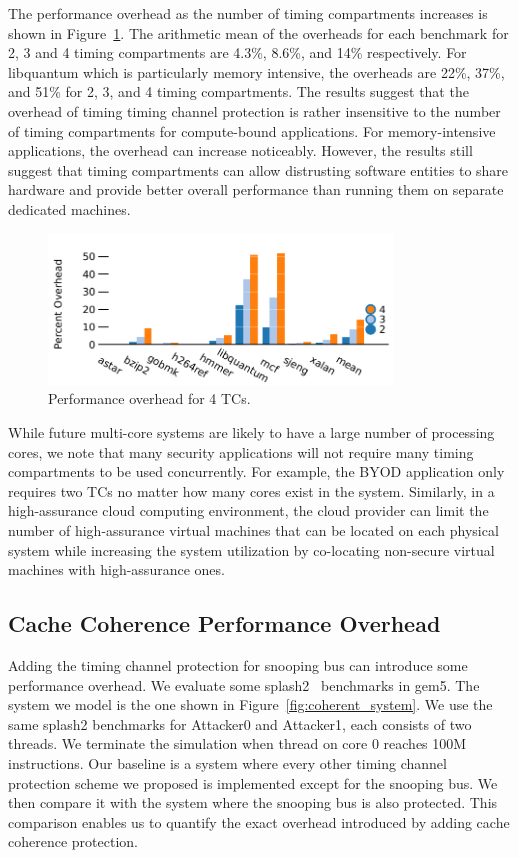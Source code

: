 The performance overhead as the number of timing compartments increases is 
shown in Figure~\ref{fig:scalability}. The arithmetic mean of the overheads for 
each benchmark for 2, 3 and 4 timing compartments are 4.3\%, 8.6\%, and 14\% 
respectively. For libquantum which is particularly memory intensive, the 
overheads are 22\%, 37\%, and 51\% for 2, 3, and 4 timing compartments. The 
results suggest that the overhead of timing timing channel protection is rather 
insensitive to the number of timing compartments for compute-bound 
applications. For memory-intensive applications, the overhead can increase 
noticeably. However, the results still suggest that timing compartments can 
allow distrusting software entities to share hardware and provide better 
overall performance than running them on separate dedicated machines.

\begin{figure}
    \begin{center}
        \includegraphics[width=3.6in]{figs/scalability.pdf}
        \caption{Performance overhead for 4 TCs.}
        \label{fig:scalability}
    \end{center}
\end{figure}

While future multi-core systems are likely to have a large number of processing 
cores, we note that many security applications will not require many timing 
compartments to be used concurrently. For example, the BYOD application only 
requires two TCs no matter how many cores exist in the system. Similarly, in a 
high-assurance cloud computing environment, the cloud provider can limit the
number of high-assurance virtual machines that can be located on each physical
system while increasing the system utilization by co-locating non-secure
virtual machines with high-assurance ones.

\subsection{Cache Coherence Performance Overhead}
Adding the timing channel protection for snooping bus can introduce some 
performance overhead. We evaluate some splash2~\cite{splash2} benchmarks in 
gem5. The system we model is the one shown in Figure~\ref{fig:coherent_system}.
We use the same splash2 benchmarks for Attacker0 and Attacker1, each consists 
of two threads. We terminate the simulation
when thread on core 0 reaches 100M instructions.  Our baseline is a system 
where every other timing channel protection scheme we proposed is implemented 
except for the snooping bus.
We then compare it with the system where the snooping bus is also protected. 
This comparison enables us to quantify the exact overhead introduced by adding 
cache coherence protection. 

